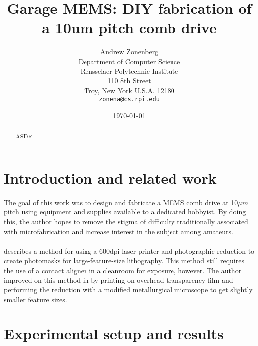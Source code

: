 \documentclass[twocolumn]{article}
\begin{document}
\title{Garage MEMS: DIY fabrication of a 10um pitch comb drive}
\author{Andrew Zonenberg\\
	Department of Computer Science\\
	Rensselaer Polytechnic Institute\\
	110 8th Street\\
	Troy, New York U.S.A. 12180\\
	\texttt{zonena@cs.rpi.edu}}
\date{\today}
\maketitle

\begin{abstract}
\paragraph*{}
ASDF
\end{abstract}

\section{Introduction and related work}
\paragraph*{}
The goal of this work was to design and fabricate a MEMS comb drive at 10$\mu m$ pitch using
equipment and supplies available to a dedicated hobbyist. By doing this, the author hopes to remove
the stigma of difficulty traditionally associated with microfabrication and increase interest in the
subject among amateurs.

\paragraph*{}
\cite{OfficePrint} describes a method for using a 600dpi laser printer and photographic reduction to
create photomasks for large-feature-size lithography. This method still requires the use of a
contact aligner in a cleanroom for exposure, however. The author improved on this method in
\cite{DiyFab} by printing on overhead transparency film and performing the reduction with a
modified metallurgical microscope to get slightly smaller feature sizes.

\section{Experimental setup and results}
\end{document}
